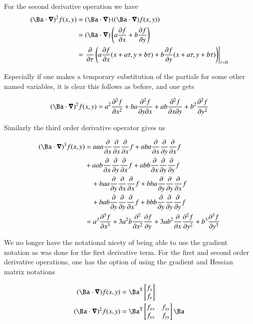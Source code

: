 \documentclass{article}
\newcommand{\PDSq}[2]{\frac{\partial^2 {#2}}{\partial {#1}^2}}
\newcommand{\transpose}[1]{{#1}^{\mathrm{T}}}
\begin{document}
For the second derivative operation we have
\begin{align*}
(\Ba \cdot \spacegrad)^2 f(x,y) 
&=
(\Ba \cdot \spacegrad) 
\left( (\Ba \cdot \spacegrad) f(x,y) \right) \\
&=
(\Ba \cdot \spacegrad) \left( a \PD{x}{f} +b \PD{y}{f} \right) \\
&= \left. \PD{\tau}{} \left( a \PD{x}{f}(x + a\tau, y + b\tau) + b \PD{y}{f}(x + a\tau, y + b\tau) \right) \right\vert_{\tau=0} \\
\end{align*}

Especially if one makes a temporary substitution of the partials for some other named variables, it is clear this follows as 
before, and one gets

\begin{align*}
(\Ba \cdot \spacegrad)^2 f(x,y) 
&=
a^2 \PDSq{x}{f} + b a \PDD{y}{x}{f} 
+a b \PDD{x}{y}{f} + b^2 \PDSq{y}{f} \\
\end{align*}

Similarly the third order derivative operator gives us

\begin{align*}
(\Ba \cdot \spacegrad)^3 f(x,y) 
&=
a a a \PD{x}{}\PD{x}{}\PD{x}{} f + a b a \PD{x}{}\PD{y}{}\PD{x}{}{f}  \\
\quad&+a a b \PD{x}{}\PD{y}{}\PD{x}{} f + a b b \PD{x}{}\PD{y}{}\PD{y}{}{f} \\
&\quad+b a a \PD{y}{}\PD{x}{}\PD{x}{} f + b b a \PD{y}{}\PD{y}{}\PD{x}{}{f} \\
&\quad+b a b \PD{y}{}\PD{y}{}\PD{x}{} f + b b b \PD{y}{}\PD{y}{}\PD{y}{}{f} \\
&=
a^3 \frac{\partial^3 f}{\partial x^3} 
+ 3 a^2 b \PDSq{x}{}\PD{y}{f}
+ 3 a b^2 \PD{x}{}\PDSq{y}{f} 
+b^3 \frac{\partial^3 f}{\partial y^3} 
\end{align*}

We no longer have the notational nicety of being able to use the gradient notation as was done for the first derivative term.  For the 
first and second order derivative operations, one has the
option of using the gradient and Hessian matrix notations

\begin{align*}
(\Ba \cdot \spacegrad) f(x,y) &=
\transpose{\Ba} 
\begin{bmatrix}
f_{x} \\
f_{y} 
\end{bmatrix} 
\\
(\Ba \cdot \spacegrad)^2 f(x,y) 
&=
\transpose{\Ba} 
\begin{bmatrix}
f_{xx} & f_{xy} \\
f_{yx} & f_{yy}
\end{bmatrix}
\Ba
\end{align*}
\end{document}

